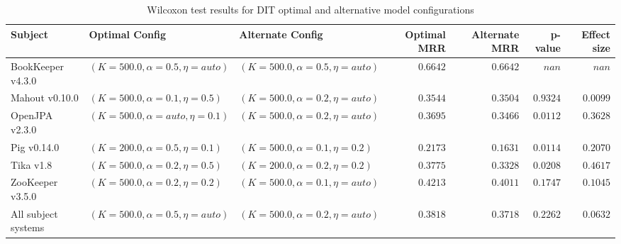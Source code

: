 
\begin{table}
\begin{spacing}{1.2}
\centering
\caption{Wilcoxon test results for DIT optimal and alternative model configurations}
\label{table:combo-dit-model-sweep-wilcox}
\begin{tabular}{lllrrrr}
\toprule
                      Subject &                      Optimal Config &                    Alternate Config & Optimal MRR & Alternate MRR &  p-value & Effect size \\
\midrule
            BookKeeper v4.3.0 &  $(K=500.0, \alpha=0.5, \eta=auto)$ &  $(K=500.0, \alpha=0.5, \eta=auto)$ &    $0.6642$ &      $0.6642$ &    $nan$ &       $nan$ \\
               Mahout v0.10.0 &   $(K=500.0, \alpha=0.1, \eta=0.5)$ &  $(K=500.0, \alpha=0.2, \eta=auto)$ &    $0.3544$ &      $0.3504$ & $0.9324$ &    $0.0099$ \\
               OpenJPA v2.3.0 &  $(K=500.0, \alpha=auto, \eta=0.1)$ &  $(K=500.0, \alpha=0.2, \eta=auto)$ &    $0.3695$ &      $0.3466$ & $0.0112$ &    $0.3628$ \\
                  Pig v0.14.0 &   $(K=200.0, \alpha=0.5, \eta=0.1)$ &   $(K=500.0, \alpha=0.1, \eta=0.2)$ &    $0.2173$ &      $0.1631$ & $0.0114$ &    $0.2070$ \\
                    Tika v1.8 &   $(K=500.0, \alpha=0.2, \eta=0.5)$ &   $(K=200.0, \alpha=0.2, \eta=0.2)$ &    $0.3775$ &      $0.3328$ & $0.0208$ &    $0.4617$ \\
             ZooKeeper v3.5.0 &   $(K=500.0, \alpha=0.2, \eta=0.2)$ &  $(K=500.0, \alpha=0.1, \eta=auto)$ &    $0.4213$ &      $0.4011$ & $0.1747$ &    $0.1045$ \\
 \midrule
All subject systems &  $(K=500.0, \alpha=0.5, \eta=auto)$ &  $(K=500.0, \alpha=0.2, \eta=auto)$ &    $0.3818$ &      $0.3718$ & $0.2262$ &    $0.0632$ \\
\bottomrule
\end{tabular}

\end{spacing}
\end{table}


